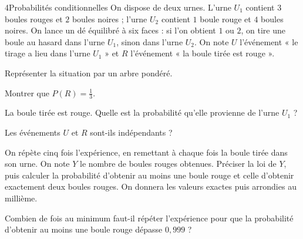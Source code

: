 

\begin{exoBac}{4}{Probabilités conditionnelles}
On dispose de deux urnes. L'urne $U_1$ contient $3$ boules rouges et $2$ boules noires ; l'urne $U_2$ contient $1$ boule rouge et $4$ boules
noires. On lance un dé équilibré à six faces : si l'on obtient $1$ ou $2$, on tire une boule au hasard dans l'urne $U_1$, sinon dans
l'urne $U_2$. On note $U$ l'événement « le tirage a lieu dans l'urne $U_1$ » et $R$ l'événement « la boule tirée est rouge ».
\begin{questions}
  \item Représenter la situation par un arbre pondéré.
  \item Montrer que $P(R)=\frac13$.
  \item La boule tirée est rouge. Quelle est la probabilité qu'elle provienne de l'urne $U_1$ ?
  \item Les événements $U$ et $R$ sont-ils indépendants ?
  \item On répète cinq fois l'expérience, en remettant à chaque fois la boule tirée dans son urne. On note $Y$ le nombre de boules
    rouges obtenues. Préciser la loi de $Y$, puis calculer la probabilité d'obtenir au moins une boule rouge et celle d'obtenir
    exactement deux boules rouges. On donnera les valeurs exactes puis arrondies au millième.
  \item Combien de fois au minimum faut-il répéter l'expérience pour que la probabilité d'obtenir au moins une boule rouge dépasse
    $0{,}999$ ?
\end{questions}
\end{exoBac}

